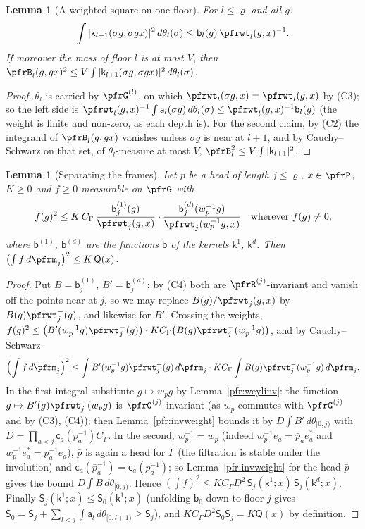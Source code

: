 \documentclass[10pt]{amsart}
\newtheorem{lemma}[theorem]{Lemma}
\theoremstyle{definition}
\theoremstyle{remark}
\begin{document}
\begin{lemma}[A weighted square on one floor]\label{pfr:floorsq}
For $l\le\varrho$ and all $g$:
\[
\int|\mathsf k_{l+1}(\sigma g,\sigma gx)|^2\,d\theta_l(\sigma)\le\mathsf b_l(g)\,\pfrwt_l(g,x)^{-1}.
\]
If moreover the mass of floor $l$ is at most $V$, then $\pfrB_l(g,gx)^2\le V\int|\mathsf k_{l+1}(\sigma g,\sigma
gx)|^2\,d\theta_l(\sigma)$.
\end{lemma}
\begin{proof}
$\theta_l$ is carried by $\pfrG^{(l)}$, on which $\pfrwt_l(\sigma g,x)=\pfrwt_l(g,x)$ by (C3); so the left
side is $\pfrwt_l(g,x)^{-1}\int\mathsf a_l(\sigma g)\,d\theta_l(\sigma)\le\pfrwt_l(g,x)^{-1}\mathsf b_l(g)$ (the
weight is finite and non-zero, as each depth is). For the second claim, by (C2) the integrand of
$\pfrB_l(g,gx)$ vanishes unless $\sigma g$ is near at $l+1$, and by Cauchy--Schwarz on that set, of
$\theta_l$-measure at most $V$, $\pfrB_l^2\le V\int|\mathsf k_{l+1}|^2$.
\end{proof}

\begin{lemma}[Separating the frames]\label{pfr:separate}
Let $p$ be a head of length $j\le\varrho$, $x\in\pfrP$, $K\ge0$ and $f\ge0$ measurable on $\pfrG$ with
\[
f(g)^2\le K\,C_\Gamma\,\frac{\mathsf b^{(1)}_j(g)}{\pfrwt_j(g,x)}\cdot\frac{\mathsf b^{(d)}_j(w_p^{-1}g)}{\pfrwt_j(w_p^{-1}g,x)}
\quad\text{wherever }f(g)\ne0,
\]
where $\mathsf b^{(1)}$, $\mathsf b^{(d)}$ are the functions $\mathsf b$ of the kernels $\mathsf k^1$,
$\mathsf k^{d}$. Then $\bigl(\int f\,d\pfrm_j\bigr)^2\le K\,\mathsf Q(x)$.
\end{lemma}
\begin{proof}
Put $B=\mathsf b^{(1)}_j$, $B'=\mathsf b^{(d)}_j$; by (C4) both are $\pfrR^{(j)}$-invariant and vanish
off the points near at $j$, so we may replace $B(g)/\pfrwt_j(g,x)$ by $B(g)\pfrwt^-_j(g)$, and likewise
for $B'$. Crossing the weights, $f(g)^2\le\bigl(B'(w_p^{-1}g)\pfrwt^-_j(g)\bigr)\cdot KC_\Gamma\bigl(B(g)
\pfrwt^-_j(w_p^{-1}g)\bigr)$, and by Cauchy--Schwarz
\[
\Bigl(\int f\,d\pfrm_j\Bigr)^2\le\int B'(w_p^{-1}g)\pfrwt^-_j(g)\,d\pfrm_j\cdot KC_\Gamma\int B(g)\pfrwt^-_j(w_p^{-1}g)\,
d\pfrm_j .
\]
In the first integral substitute $g\mapsto w_pg$ by Lemma~\ref{pfr:weylinv}: the function
$g\mapsto B'(g)\pfrwt^-_j(w_pg)$ is $\pfrG^{(j)}$-invariant (as $w_p$ commutes with $\pfrG^{(j)}$ and by
(C3), (C4)); then Lemma~\ref{pfr:invweight} bounds it by $D\int B'\,d\theta_{[0,j)}$ with
$D=\prod_{a<j}\mathsf c_a(p_a^{-1})C_\Gamma$. In the second, $w_p^{-1}=w_{\bar p}$ (indeed $w_p^{-1}e_a=\bar p_ae_a^*$ and $w_p^{-1}e_a^*=p_a^{-1}e_a$),
$\bar p$ is again a head for $\Gamma$ (the filtration is stable under the involution) and
$\mathsf c_a(\bar p_a^{-1})=\mathsf c_a(p_a^{-1})$; so Lemma~\ref{pfr:invweight} for the head $\bar p$
gives the bound $D\int B\,d\theta_{[0,j)}$. Hence
$(\int f)^2\le KC_\Gamma D^2\,\mathsf S_j(\mathsf k^1;x)\,\mathsf S_j(\mathsf k^d;x)$. Finally
$\mathsf S_j(\mathsf k^1;x)\le\mathsf S_0(\mathsf k^1;x)$ (unfolding $\mathsf b_0$ down to floor $j$ gives
$\mathsf S_0=\mathsf S_j+\sum_{l<j}\int\mathsf a_l\,d\theta_{[0,l+1)}\ge\mathsf S_j$), and $KC_\Gamma D^2\mathsf S_0
\mathsf S_j=K\mathsf Q(x)$ by definition.
\end{proof}
\end{document}
